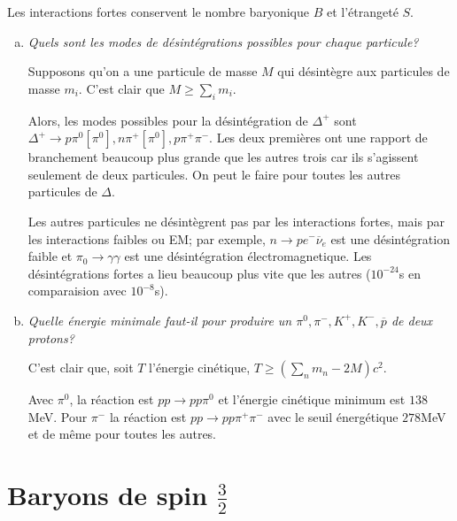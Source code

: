 \documentclass[10pt]{report}
\begin{document}
Les interactions fortes conservent le nombre baryonique $B$ et l'\'etranget\'e $S$.
\begin{enumerate}[a)]
    \item \emph{Quels sont les modes de d\'esint\'egrations possibles pour chaque particule?}

        Supposons qu'on a une particule de masse $M$ qui d\'esint\`egre aux particules de masse $m_i$. C'est clair que $M \geq \sum\limits_{i}^{}m_i$.

        Alors, les modes possibles pour la d\'esint\'egration de $\Delta^+$ sont $\Delta^+ \to p \pi^0[\pi^0], n\pi^+[\pi^0],p\pi^+\pi^-$. Les deux premi\`eres ont une rapport de branchement beaucoup plus grande que les autres trois car ils s'agissent seulement de deux particules. On peut le faire pour toutes les autres particules de $\Delta$.

        Les autres particules ne d\'esint\`egrent pas par les interactions fortes, mais par les interactions faibles ou EM; par exemple, $n \to pe^-\overline{\nu}_e$ est une d\'esint\'egration faible et $\pi_0 \to \gamma\gamma$ est une d\'esint\'egration \'electromagnetique. Les d\'esint\'egrations fortes a lieu beaucoup plus vite que les autres ($10^{-24}$s en comparaision avec $10^{-8}$s).

    \item \emph{Quelle \'energie minimale faut-il pour produire un $\pi^0, \pi^-, K^+, K^-, \overline{p}$ de deux protons?}

        C'est clair que, soit $T$ l'\'energie cin\'etique, $T \geq \left( \sum\limits_{n}^{}m_n - 2M \right)c^2$.

        Avec $\pi^0$, la r\'eaction est $pp \to pp \pi^0$ et l'\'energie cin\'etique minimum est $138$MeV. Pour $\pi^-$ la r\'eaction est $pp \to pp \pi^+ \pi^-$ avec le seuil \'energ\'etique $278$MeV et de m\^eme pour toutes les autres.
\end{enumerate}

\section{Baryons de spin $\frac{3}{2}$}
\end{document}
